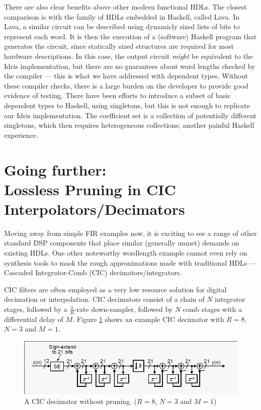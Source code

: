 \documentclass[conference]{IEEEtran}
\begin{document}
There are also clear benefits above other modern functional HDLs. The closest
comparison is with the family of HDLs embedded in Haskell, called
Lava\cite{gill_09}. In Lava, a similar circuit can be described using dynamicly
sized lists of bits to represent each word. It is then the execution of a
(software) Haskell program that generates the circuit, since statically sized
structures are required for most hardware descriptions. In this case, the output
circuit \emph{might} be equivalent to the Idris implementation, but there are no
guarantees about word lengths checked by the compiler --- this is what we have
addressed with dependent types. Without these compiler checks, there is a large
burden on the developer to provide good evidence of testing. There have been
efforts to introduce a subset of basic dependent types to Haskell, using
singletons, but this is not enough to replicate our Idris
implementation\cite{lindley_13}. The coefficient set is a collection of
potentially different singletons, which then requires heterogeneous collections;
another painful Haskell experience.

\section{Going further:\\Lossless Pruning in CIC Interpolators/Decimators}

Moving away from simple FIR examples now, it is exciting to see a range of other
standard DSP components that place similar (generally unmet) demands on existing
HDLs. One other noteworthy wordlength example cannot even rely on synthesis
tools to mask the rough approximations made with traditional HDLs --- Cascaded
Integrator-Comb (CIC) decimators/integrators.

CIC filters are often employed as a very low resource solution for digital
decimation or interpolation. CIC decimators consist of a chain of $N$ integrator
stages, followed by a $\frac{1}{R}$-rate down-sampler, followed by $N$ comb
stages with a differential delay of $M$. Figure \ref{fig:cic} shows an example
CIC decimator with $R=8$, $N=3$ and $M=1$.

\begin{figure}
  \centering
  \includegraphics[width=\linewidth]{img/cic_draft}
  \caption{A CIC decimator without pruning. ($R=8$, $N=3$ and $M=1$)}
  \label{fig:cic}
\end{figure}
\end{document}
